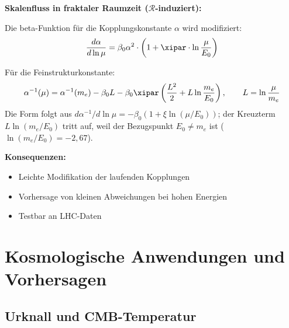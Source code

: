 	\begin{beziehung}
		\textbf{Skalenfluss in fraktaler Raumzeit ($\mathcal{R}$-induziert):}
		
		Die beta-Funktion für die Kopplungskonstante $\alpha$ wird modifiziert:
		\begin{equation}
			\frac{d\alpha}{d\ln\mu} = \beta_0 \alpha^2 \cdot \left(1 + \xipar \cdot \ln\frac{\mu}{E_0}\right)
		\end{equation}
		
		Für die Feinstrukturkonstante:
		\begin{equation}
			\alpha^{-1}(\mu) = \alpha^{-1}(m_e) - \beta_0 L - \beta_0 \xipar \left(\frac{L^2}{2} + L \ln\frac{m_e}{E_0}\right), \qquad L = \ln\frac{\mu}{m_e}
		\end{equation}
		Die Form folgt aus $d\alpha^{-1}/d\ln\mu = -\beta_0(1+\xi\ln(\mu/E_0))$; der Kreuzterm $L\ln(m_e/E_0)$ tritt auf, weil der Bezugspunkt $E_0 \neq m_e$ ist ($\ln(m_e/E_0) = -2{,}67$).
		
		\textbf{Konsequenzen:}
		\begin{itemize}
			\item Leichte Modifikation der laufenden Kopplungen
			\item Vorhersage von kleinen Abweichungen bei hohen Energien
			\item Testbar an LHC-Daten
		\end{itemize}
	\end{beziehung}
	
	\section{Kosmologische Anwendungen und Vorhersagen}
	
	\subsection{Urknall und CMB-Temperatur}
	
